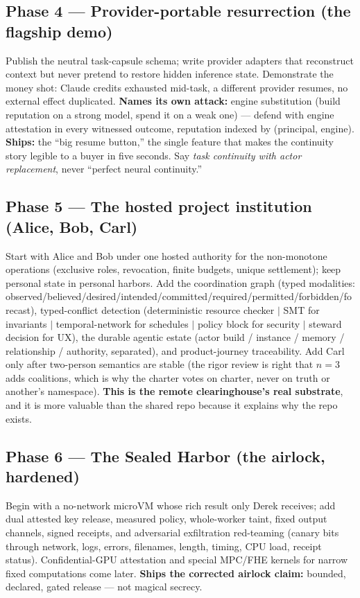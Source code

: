 \documentclass[11pt,a4paper]{article}
\begin{document}
\subsection*{Phase 4 --- Provider-portable resurrection (the flagship demo)}
Publish the neutral task-capsule schema; write provider adapters that reconstruct context but never pretend to restore hidden inference state. Demonstrate the money shot: Claude credits exhausted mid-task, a different provider resumes, no external effect duplicated. \textbf{Names its own attack:} engine substitution (build reputation on a strong model, spend it on a weak one) --- defend with engine attestation in every witnessed outcome, reputation indexed by (principal, engine). \textbf{Ships:} the ``big resume button,'' the single feature that makes the continuity story legible to a buyer in five seconds. Say \emph{task continuity with actor replacement}, never ``perfect neural continuity.''

\subsection*{Phase 5 --- The hosted project institution (Alice, Bob, Carl)}
Start with Alice and Bob under one hosted authority for the non-monotone operations (exclusive roles, revocation, finite budgets, unique settlement); keep personal state in personal harbors. Add the coordination graph (typed modalities: observed/believed/desired/intended/committed/required/permitted/forbidden/forecast), typed-conflict detection (deterministic resource checker $\mid$ SMT for invariants $\mid$ temporal-network for schedules $\mid$ policy block for security $\mid$ steward decision for UX), the durable agentic estate (actor build / instance / memory / relationship / authority, separated), and product-journey traceability. Add Carl only after two-person semantics are stable (the rigor review is right that $n{=}3$ adds coalitions, which is why the charter votes on charter, never on truth or another's namespace). \textbf{This is the remote clearinghouse's real substrate}, and it is more valuable than the shared repo because it explains why the repo exists.

\subsection*{Phase 6 --- The Sealed Harbor (the airlock, hardened)}
Begin with a no-network microVM whose rich result only Derek receives; add dual attested key release, measured policy, whole-worker taint, fixed output channels, signed receipts, and adversarial exfiltration red-teaming (canary bits through network, logs, errors, filenames, length, timing, CPU load, receipt status). Confidential-GPU attestation and special MPC/FHE kernels for narrow fixed computations come later. \textbf{Ships the corrected airlock claim:} bounded, declared, gated release --- not magical secrecy.
\end{document}
